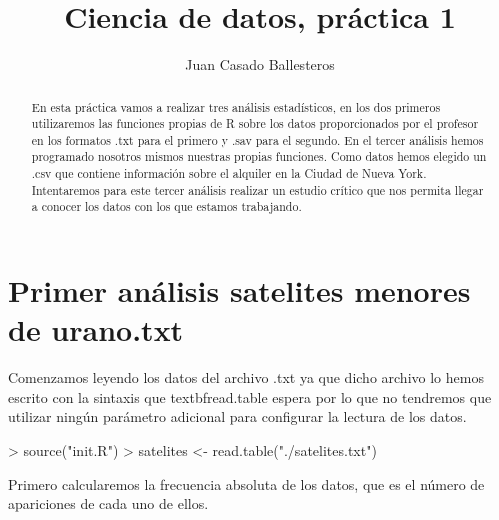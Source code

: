 \documentclass [a4paper] {article}
\title{Ciencia de datos, práctica 1}
\author{Juan Casado Ballesteros}
\begin{document}
\maketitle

\begin{abstract}
En esta práctica vamos a realizar tres análisis estadísticos, 
en los dos primeros utilizaremos las funciones propias de R sobre los datos proporcionados por el profesor en los formatos .txt para el primero y .sav para el segundo.
En el tercer análisis hemos programado nosotros mismos nuestras propias funciones. 
Como datos hemos elegido un .csv que contiene información sobre el alquiler en la Ciudad de Nueva York.
Intentaremos para este tercer análisis realizar un estudio crítico que nos permita llegar a conocer los datos con los que estamos trabajando.
\end{abstract}

\tableofcontents
\newpage

\section{Primer análisis satelites menores de urano.txt}

Comenzamos leyendo los datos del archivo .txt ya que dicho archivo lo hemos escrito con la sintaxis que textbf{read.table} espera 
por lo que no tendremos que utilizar ningún parámetro adicional para configurar la lectura de los datos.
\begin{Schunk}
\begin{Sinput}
> source("init.R")
> satelites <- read.table("./satelites.txt")
\end{Sinput}
\end{Schunk}

Primero calcularemos la frecuencia absoluta de los datos, que es el número de apariciones de cada uno de ellos.

\begin{Schunk}
\end{Schunk}
\begin{center}
\end{center}
\end{document}
